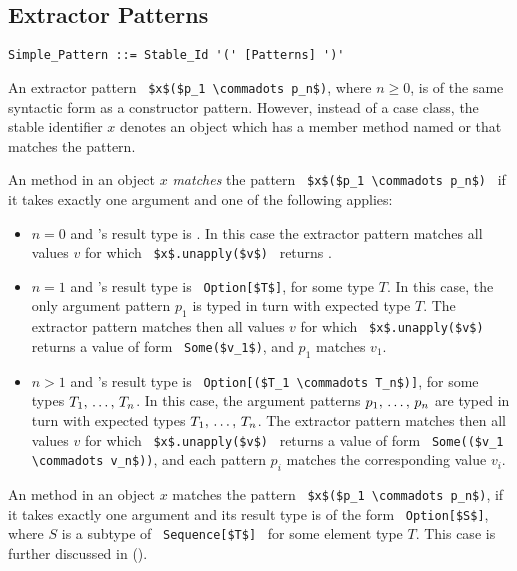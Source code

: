 \subsection{Extractor Patterns}
\label{sec:extractor-patterns}

\syntax\begin{lstlisting}
Simple_Pattern ::= Stable_Id '(' [Patterns] ')'
\end{lstlisting}

An extractor pattern ~\lstinline!$x$($p_1 \commadots p_n$)!, where $n \geq 0$, is of the same syntactic form as a constructor pattern. However, instead of a case class, the stable identifier $x$ denotes an object which has a member method named  or  that matches the pattern. 

An  method in an object $x$ {\em matches} the pattern ~\lstinline!$x$($p_1 \commadots p_n$)!~ if it takes exactly one argument and one of the following applies: 
\begin{itemize}
\item[]
$n = 0$ and 's result type is . In this case the extractor pattern matches all values $v$ for which ~\lstinline!$x$.unapply($v$)!~ returns . 
\item[]
$n = 1$ and 's result type is ~\lstinline!Option[$T$]!, for some type $T$. In this case, the only argument pattern $p_1$ is typed in turn with expected type $T$. The extractor pattern matches then all values $v$ for which ~\lstinline!$x$.unapply($v$)!~ returns a value of form ~\lstinline!Some($v_1$)!, and $p_1$ matches $v_1$. 
\item[]
$n > 1$ and 's result type is ~\lstinline!Option[($T_1 \commadots T_n$)]!, for some types $T_1 ,\, \ldots ,\, T_n$. In this case, the argument patterns $p_1 ,\, \ldots ,\, p_n$ are typed in turn with expected types $T_1 ,\, \ldots ,\, T_n$. The extractor pattern matches then all values $v$ for which ~\lstinline!$x$.unapply($v$)!~ returns a value of form ~\lstinline!Some(($v_1 \commadots v_n$))!, and each pattern $p_i$ matches the corresponding value $v_i$.
\end{itemize}

An  method in an object $x$ matches the pattern ~\lstinline!$x$($p_1 \commadots p_n$)!, if it takes exactly one argument and its result type is of the form ~\lstinline!Option[$S$]!, where $S$ is a subtype of ~\lstinline!Sequence[$T$]!~ for some element type $T$. This case is further discussed in ().





